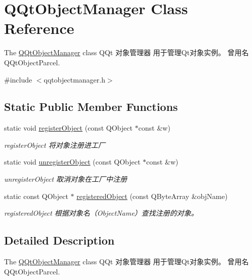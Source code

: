 \hypertarget{class_q_qt_object_manager}{}\section{Q\+Qt\+Object\+Manager Class Reference}
\label{class_q_qt_object_manager}


The \mbox{\hyperlink{class_q_qt_object_manager}{Q\+Qt\+Object\+Manager}} class Q\+Qt 对象管理器 用于管理\+Qt对象实例。 曾用名 Q\+Qt\+Object\+Parcel.  




{\ttfamily \#include $<$qqtobjectmanager.\+h$>$}

\subsection*{Static Public Member Functions}
\begin{DoxyCompactItemize}
\item 
static void \mbox{\hyperlink{class_q_qt_object_manager_a43c7c39865f1dbcbcbecafcf21f76660}{register\+Object}} (const Q\+Object $\ast$const \&w)
\begin{DoxyCompactList}\small\item\em register\+Object 将对象注册进工厂 \end{DoxyCompactList}\item 
static void \mbox{\hyperlink{class_q_qt_object_manager_a4136029b539fb6ddd09a3473237721fa}{unregister\+Object}} (const Q\+Object $\ast$const \&w)
\begin{DoxyCompactList}\small\item\em unregister\+Object 取消对象在工厂中注册 \end{DoxyCompactList}\item 
static const Q\+Object $\ast$ \mbox{\hyperlink{class_q_qt_object_manager_a3046f21752fc45777510b13b918a2a96}{registered\+Object}} (const Q\+Byte\+Array \&obj\+Name)
\begin{DoxyCompactList}\small\item\em registered\+Object 根据对象名（\+Object\+Name）查找注册的对象。 \end{DoxyCompactList}\end{DoxyCompactItemize}


\subsection{Detailed Description}
The \mbox{\hyperlink{class_q_qt_object_manager}{Q\+Qt\+Object\+Manager}} class Q\+Qt 对象管理器 用于管理\+Qt对象实例。 曾用名 Q\+Qt\+Object\+Parcel. 

